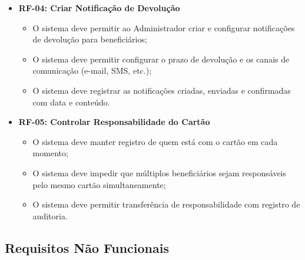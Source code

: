 \documentclass[
  article,
  a4paper,
  12pt,
  oneside,
  fleqn
]{abntex2}
\begin{document}
\begin{itemize}
    \item \textbf{RF-04: Criar Notificação de Devolução}
    \begin{itemize}
        \item O sistema deve permitir ao Administrador criar e configurar notificações de devolução para beneficiários;
        \item O sistema deve permitir configurar o prazo de devolução e os canais de comunicação (e-mail, SMS, etc.);
        \item O sistema deve registrar as notificações criadas, enviadas e confirmadas com data e conteúdo.
    \end{itemize}

    \item \textbf{RF-05: Controlar Responsabilidade do Cartão}
    \begin{itemize}
        \item O sistema deve manter registro de quem está com o cartão em cada momento;
        \item O sistema deve impedir que múltiplos beneficiários sejam responsáveis pelo mesmo cartão simultaneamente;
        \item O sistema deve permitir transferência de responsabilidade com registro de auditoria.
    \end{itemize}
\end{itemize}

\subsection{Requisitos Não Funcionais}
\end{document}
